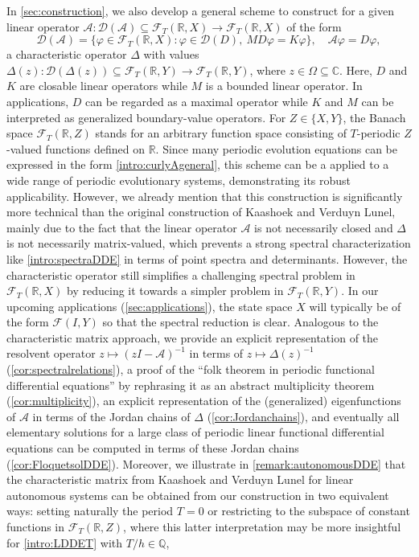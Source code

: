 \documentclass[english]{myarticle}
\begin{document}
\begin{sloppypar}
In \cref{sec:construction}, we also develop a general scheme to construct for a given linear operator $\mathcal{A} : \mathcal{D}(\mathcal{A}) \subseteq \mathcal{F}_T(\mathbb{R},X) \to \mathcal{F}_T(\mathbb{R},X)$ of the form
\begin{equation} \label{intro:curlyAgeneral}
    \mathcal{D}(\mathcal{A}) = \{ \varphi \in \mathcal{F}_T(\mathbb{R},X) : \varphi \in \mathcal{D}(D), \ MD\varphi = K \varphi \}, \quad \mathcal{A}\varphi = D\varphi,
\end{equation}
a characteristic operator $\Delta$ with values $\Delta(z) : \mathcal{D}(\Delta(z)) \subseteq \mathcal{F}_T(\mathbb{R},Y) \to \mathcal{F}_T(\mathbb{R},Y)$, where $z \in \Omega \subseteq \mathbb{C}$. Here, $D$ and $K$ are closable linear operators while $M$ is a bounded linear operator. In applications, $D$ can be regarded as a maximal operator while $K$ and $M$ can be interpreted as generalized boundary-value operators. For $Z \in \{X,Y\}$, the Banach space $\mathcal{F}_T(\mathbb{R},Z)$ stands for an arbitrary function space consisting of $T$-periodic $Z$-valued functions defined on $\mathbb{R}$. Since many periodic evolution equations can be expressed in the form \eqref{intro:curlyAgeneral}, this scheme can be a applied to a wide range of periodic evolutionary systems, demonstrating its robust applicability. However, we already mention that this construction is significantly more technical than the original construction of Kaashoek and Verduyn Lunel, mainly due to the fact that the linear operator $\mathcal{A}$ is not necessarily closed and $\Delta$ is not necessarily matrix-valued, which prevents a strong spectral characterization like \eqref{intro:spectraDDE} in terms of point spectra and determinants. However, the characteristic operator still simplifies a challenging spectral problem in $\mathcal{F}_T(\mathbb{R},X)$ by reducing it towards a simpler problem in $\mathcal{F}_T(\mathbb{R},Y)$. In our upcoming applications (\cref{sec:applications}), the state space $X$ will typically be of the form $\mathcal{F}(I,Y)$ so that the spectral reduction is clear. Analogous to the characteristic matrix approach, we provide an explicit representation of the resolvent operator $z \mapsto (zI-\mathcal{A})^{-1}$ in terms of $z \mapsto \Delta(z)^{-1}$ (\cref{cor:spectralrelations}), a proof of the ``folk theorem in periodic functional differential equations'' by rephrasing it as an abstract multiplicity theorem (\cref{cor:multiplicity}), an explicit representation of the (generalized) eigenfunctions of $\mathcal{A}$ in terms of the Jordan chains of $\Delta$ (\cref{cor:Jordanchains}), and eventually all elementary solutions for a large class of periodic linear functional differential equations can be computed in terms of these Jordan chains (\cref{cor:FloquetsolDDE}). Moreover, we illustrate in \cref{remark:autonomousDDE} that the characteristic matrix from Kaashoek and Verduyn Lunel for linear autonomous systems can be obtained from our construction in two equivalent ways: setting naturally the period $T=0$ or restricting to the subspace of constant functions in $\mathcal{F}_T(\mathbb{R},Z)$, where this latter interpretation may be more insightful for \eqref{intro:LDDET} with $T/h \in \mathbb{Q}$, 
\end{sloppypar}
\end{document}
